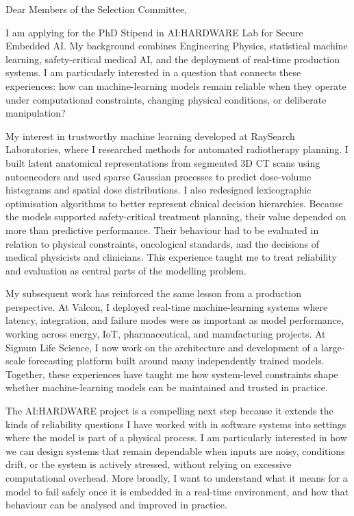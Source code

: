 \documentclass[11pt,a4paper]{moderncv}
\begin{document}
\makecvtitle
Dear Members of the Selection Committee,

\vspace*{2em}
I am applying for the PhD Stipend in AI:HARDWARE Lab for Secure Embedded AI. My background combines Engineering Physics, statistical machine learning, safety-critical medical AI, and the deployment of real-time production systems. I am particularly interested in a question that connects these experiences: how can machine-learning models remain reliable when they operate under computational constraints, changing physical conditions, or deliberate manipulation?

\hspace*{2em}
My interest in trustworthy machine learning developed at RaySearch Laboratories, where I researched methods for automated radiotherapy planning. I built latent anatomical representations from segmented 3D CT scans using autoencoders and used sparse Gaussian processes to predict dose-volume histograms and spatial dose distributions. I also redesigned lexicographic optimisation algorithms to better represent clinical decision hierarchies. Because the models supported safety-critical treatment planning, their value depended on more than predictive performance. Their behaviour had to be evaluated in relation to physical constraints, oncological standards, and the decisions of medical physicists and clinicians. This experience taught me to treat reliability and evaluation as central parts of the modelling problem.

\hspace*{2em}
My subsequent work has reinforced the same lesson from a production perspective. At Valcon, I deployed real-time machine-learning systems where latency, integration, and failure modes were as important as model performance, working across energy, IoT, pharmaceutical, and manufacturing projects. At Signum Life Science, I now work on the architecture and development of a large-scale forecasting platform built around many independently trained models. Together, these experiences have taught me how system-level constraints shape whether machine-learning models can be maintained and trusted in practice.

\hspace*{2em}
The AI:HARDWARE project is a compelling next step because it extends the kinds of reliability questions I have worked with in software systems into settings where the model is part of a physical process. I am particularly interested in how we can design systems that remain dependable when inputs are noisy, conditions drift, or the system is actively stressed, without relying on excessive computational overhead. More broadly, I want to understand what it means for a model to fail safely once it is embedded in a real-time environment, and how that behaviour can be analysed and improved in practice.
\end{document}
